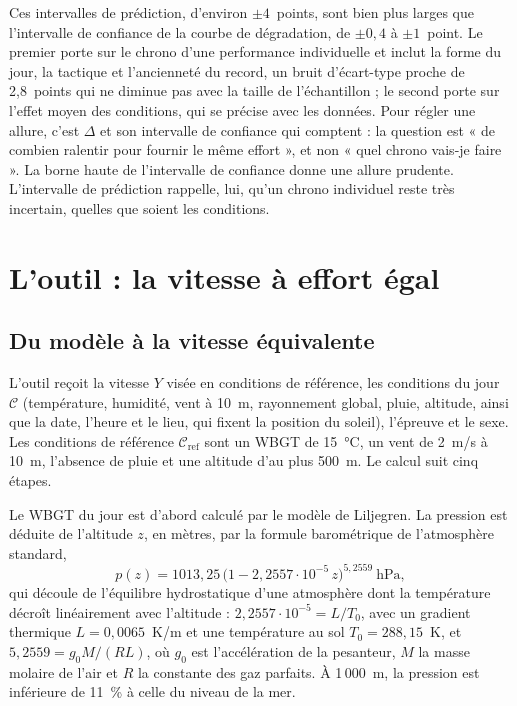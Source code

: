 \documentclass[11pt,a4paper]{article}
\begin{document}
Ces intervalles de prédiction, d'environ $\pm 4$~points, sont bien plus larges que l'intervalle de confiance de la
courbe de dégradation, de $\pm 0{,}4$ à $\pm 1$~point. Le premier porte sur le chrono d'une performance individuelle et
inclut la forme du jour, la tactique et l'ancienneté du record, un bruit d'écart-type proche de 2,8~points qui ne
diminue pas avec la taille de l'échantillon ; le second porte sur l'effet moyen des conditions, qui se précise avec les
données. Pour régler une allure, c'est $\Delta$ et son intervalle de confiance qui comptent : la question est « de
combien ralentir pour fournir le même effort », et non « quel chrono vais-je faire ». La borne haute de l'intervalle de
confiance donne une allure prudente. L'intervalle de prédiction rappelle, lui, qu'un chrono individuel reste très
incertain, quelles que soient les conditions.

\section{L'outil : la vitesse à effort égal}\label{sec:outil}

\subsection{Du modèle à la vitesse équivalente}\label{sec:conversion}

L'outil reçoit la vitesse $Y$ visée en conditions de référence, les conditions du jour $\mathcal{C}$ (température,
humidité, vent à 10~m, rayonnement global, pluie, altitude, ainsi que la date, l'heure et le lieu, qui fixent la
position du soleil), l'épreuve et le sexe. Les conditions de référence $\mathcal{C}_{\text{ref}}$ sont un WBGT de
15~°C, un vent de 2~m/s à 10~m, l'absence de pluie et une altitude d'au plus 500~m. Le calcul suit cinq étapes.

Le WBGT du jour est d'abord calculé par le modèle de Liljegren. La pression est déduite de l'altitude $z$, en mètres,
par la formule barométrique de l'atmosphère standard,
\[
p(z) = 1013{,}25\,\big(1 - 2{,}2557\cdot 10^{-5}\,z\big)^{5{,}2559}\ \text{hPa},
\]
qui découle de l'équilibre hydrostatique d'une atmosphère dont la température décroît linéairement avec l'altitude :
$2{,}2557\cdot10^{-5} = L/T_0$, avec un gradient thermique $L = 0{,}0065$~K/m et une température au sol
$T_0 = 288{,}15$~K, et $5{,}2559 = g_0 M/(R L)$, où $g_0$ est l'accélération de la pesanteur, $M$ la masse molaire de
l'air et $R$ la constante des gaz parfaits. À 1\,000~m, la pression est inférieure de 11~\% à celle du niveau de la
mer.
\end{document}
